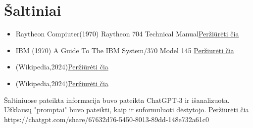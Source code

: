 \documentclass{article}
\begin{document}
\section*{Šaltiniai}
\begin{itemize}
    \item Raytheon Compiuter(1970) Raytheon 704 Technical Manual\href{https://bitsavers.org/pdf/raytheon/70x/Ray704_TechnicalManual_Jul1970.pdf}{Peržiūrėti čia}
    \item IBM (1970) A Guide To The IBM System/370 Model 145 \href{http://www.bitsavers.org/pdf/ibm/370/systemGuide/GC20-1734-2_370-145_Guide_Aug72.pdf}{Peržiūrėti čia}
    \item (Wikipedia,2024)\href{https://en.wikipedia.org/wiki/IBM_System/370}{Peržiūrėti čia}
    \item (Wikipedia,2024)\href{https://en.wikipedia.org/wiki/Raytheon_704}{Peržiūrėti čia}
\end{itemize}
Šaltiniuose pateikta informacija buvo pateikta ChatGPT-3 ir išanalizuota. Užklausų "promptai" buvo pateikti, kaip ir suformuluoti dėstytojo.
\href{https://chatgpt.com/share/67632d76-5450-8013-89dd-148e732a61c0}{Peržiūrėti čia}\\
https://chatgpt.com/share/67632d76-5450-8013-89dd-148e732a61c0
\end{document}
